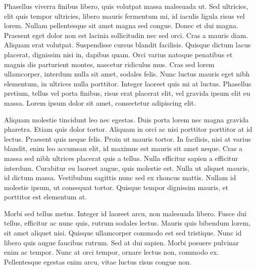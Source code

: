 Phasellus viverra finibus libero, quis volutpat massa malesuada ut. Sed ultricies, elit quis tempor ultricies, libero mauris fermentum mi, id iaculis ligula risus vel lorem. Nullam pellentesque sit amet magna sed congue. Donec et dui magna. Praesent eget dolor non est lacinia sollicitudin nec sed orci. Cras a mauris diam. Aliquam erat volutpat. Suspendisse cursus blandit facilisis. Quisque dictum lacus placerat, dignissim nisi in, dapibus quam. Orci varius natoque penatibus et magnis dis parturient montes, nascetur ridiculus mus. Cras sed lorem ullamcorper, interdum nulla sit amet, sodales felis. Nunc luctus mauris eget nibh elementum, in ultrices nulla porttitor. Integer laoreet quis mi at luctus. Phasellus pretium, tellus vel porta finibus, risus erat placerat elit, vel gravida ipsum elit eu massa. Lorem ipsum dolor sit amet, consectetur adipiscing elit.

Aliquam molestie tincidunt leo nec egestas. Duis porta lorem nec magna gravida pharetra. Etiam quis dolor tortor. Aliquam in orci ac nisi porttitor porttitor at id lectus. Praesent quis neque felis. Proin ut mauris tortor. In facilisis, nisi at varius blandit, enim leo accumsan elit, id maximus est mauris sit amet neque. Cras a massa sed nibh ultrices placerat quis a tellus. Nulla efficitur sapien a efficitur interdum. Curabitur eu laoreet augue, quis molestie est. Nulla ut aliquet mauris, id dictum massa. Vestibulum sagittis nunc sed ex rhoncus mattis. Nullam id molestie ipsum, ut consequat tortor. Quisque tempor dignissim mauris, et porttitor est elementum at.

Morbi sed tellus metus. Integer id laoreet arcu, non malesuada libero. Fusce dui tellus, efficitur ac nunc quis, rutrum sodales lectus. Mauris quis bibendum lorem, sit amet aliquet nisi. Quisque ullamcorper commodo est sed tristique. Nunc id libero quis augue faucibus rutrum. Sed at dui sapien. Morbi posuere pulvinar enim ac tempor. Nunc at orci tempor, ornare lectus non, commodo ex. Pellentesque egestas enim arcu, vitae luctus risus congue non.
